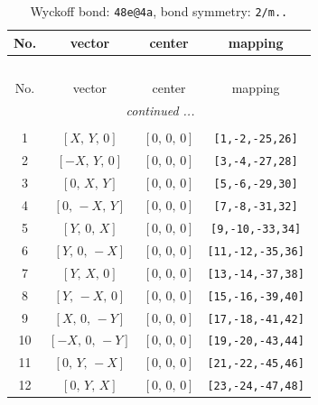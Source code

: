 \documentclass[fleqn,8pt]{jsarticle}
\begin{document}
\begin{longtable}{cccc}
\caption{Wyckoff bond: {\tt 48e@4a}, bond symmetry: {\tt 2/m..}}
 \\
 \hline \hline
No. & vector & center & mapping \\ \hline \endfirsthead

\multicolumn{3}{l}{\tablename\ \thetable{}} \\
 \hline \hline
No. & vector & center & mapping \\ \hline \endhead

 \hline \hline
\multicolumn{3}{r}{\footnotesize\it continued ...} \\ \endfoot

 \hline \hline
\multicolumn{3}{r}{} \\ \endlastfoot

1 & $\left[ X,\, Y,\, 0 \right]$ & $\left[ 0,\, 0,\, 0 \right]$ & {\tt [1,-2,-25,26]} \\ \hline
2 & $\left[ - X,\, Y,\, 0 \right]$ & $\left[ 0,\, 0,\, 0 \right]$ & {\tt [3,-4,-27,28]} \\ \hline
3 & $\left[ 0,\, X,\, Y \right]$ & $\left[ 0,\, 0,\, 0 \right]$ & {\tt [5,-6,-29,30]} \\ \hline
4 & $\left[ 0,\, - X,\, Y \right]$ & $\left[ 0,\, 0,\, 0 \right]$ & {\tt [7,-8,-31,32]} \\ \hline
5 & $\left[ Y,\, 0,\, X \right]$ & $\left[ 0,\, 0,\, 0 \right]$ & {\tt [9,-10,-33,34]} \\ \hline
6 & $\left[ Y,\, 0,\, - X \right]$ & $\left[ 0,\, 0,\, 0 \right]$ & {\tt [11,-12,-35,36]} \\ \hline
7 & $\left[ Y,\, X,\, 0 \right]$ & $\left[ 0,\, 0,\, 0 \right]$ & {\tt [13,-14,-37,38]} \\ \hline
8 & $\left[ Y,\, - X,\, 0 \right]$ & $\left[ 0,\, 0,\, 0 \right]$ & {\tt [15,-16,-39,40]} \\ \hline
9 & $\left[ X,\, 0,\, - Y \right]$ & $\left[ 0,\, 0,\, 0 \right]$ & {\tt [17,-18,-41,42]} \\ \hline
10 & $\left[ - X,\, 0,\, - Y \right]$ & $\left[ 0,\, 0,\, 0 \right]$ & {\tt [19,-20,-43,44]} \\ \hline
11 & $\left[ 0,\, Y,\, - X \right]$ & $\left[ 0,\, 0,\, 0 \right]$ & {\tt [21,-22,-45,46]} \\ \hline
12 & $\left[ 0,\, Y,\, X \right]$ & $\left[ 0,\, 0,\, 0 \right]$ & {\tt [23,-24,-47,48]} \\
\end{longtable}
\renewcommand{\arraystretch}{1.2}
\end{document}
